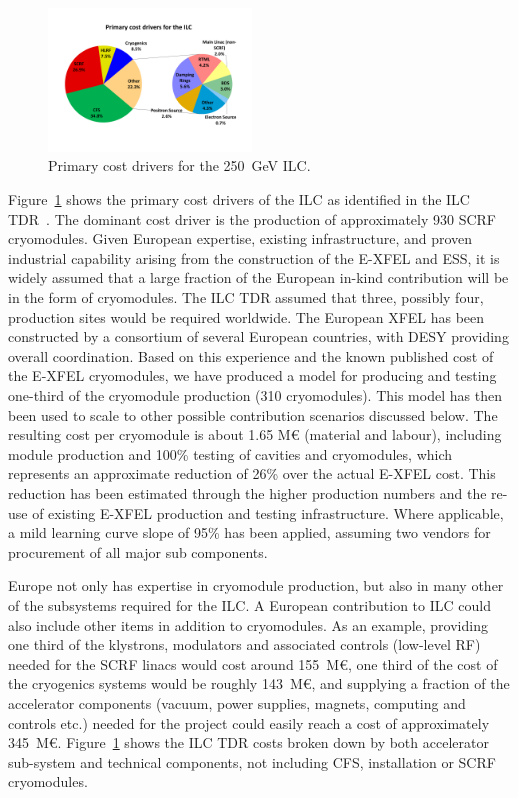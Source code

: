 \documentclass[%
 reprint,
 floatfix,
 amsmath,amssymb,
 aps,
]{revtex4-1}
\begin{document}
\begin{figure}[htbp]
\begin{center}
\includegraphics[width=0.48\textwidth]{figures/eap-chp3-ilccostdrivers.pdf}
 \caption{\label{fig:constructionmodel:ILCPrimaryCostDrivers} Primary cost drivers for the 250~GeV ILC.}
\end{center}
\end{figure}

Figure~\ref{fig:constructionmodel:ILCPrimaryCostDrivers} shows the primary cost drivers of the ILC as identified in the ILC
TDR~\cite{Adolphsen:2013kya}. The dominant cost driver is the production of approximately 930 SCRF cryomodules. Given European expertise, 
existing infrastructure, and proven industrial capability arising from the construction 
of the E-XFEL and ESS, it is widely assumed that a large fraction of the European in-kind contribution 
will be in the form of cryomodules. The ILC TDR assumed that three, possibly four, production sites 
would be required worldwide. 
The European XFEL has been constructed by a consortium of several European
countries, with DESY providing overall coordination. Based on this experience 
and the known published cost of the E-XFEL cryomodules, we have produced a model 
for producing and testing one-third of the cryomodule production (310 
cryomodules). This model has then been used to scale to other possible 
contribution scenarios discussed below. The resulting cost per cryomodule is about 1.65 M\euro{} (material and labour), including module production and 100\% 
testing of cavities and cryomodules, which represents an approximate reduction 
of 26\% over the actual E-XFEL cost. This reduction has been estimated through 
the higher production numbers and the re-use of existing E-XFEL production and 
testing infrastructure.  Where applicable, a mild learning curve slope of 95\% 
has been applied, assuming two vendors for procurement of all major sub 
components.

Europe not only has expertise in cryomodule production, but also in many other 
of the subsystems required for the ILC. A European contribution to ILC could 
also include other items in addition to cryomodules. As an example, providing 
one third of the klystrons, modulators and associated controls (low-level RF) 
needed for the SCRF linacs would cost around 155~M\euro{}, one third of the cost of 
the cryogenics systems would be roughly 143~M\euro{}, and supplying a fraction of the 
accelerator components (vacuum, power supplies, magnets, computing and controls 
etc.) needed for the project could easily reach a cost of approximately 345~M\euro{}. 
Figure~\ref{fig:constructionmodel:ILCPrimaryCostDrivers} shows the ILC TDR costs broken down by both accelerator sub-system and 
technical components, not including CFS, installation or SCRF cryomodules.
\end{document}
